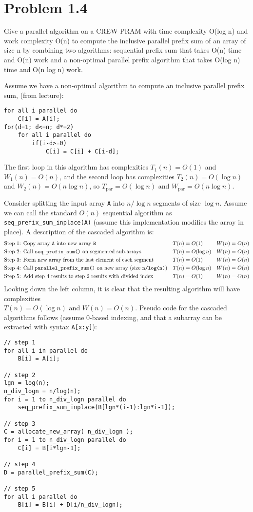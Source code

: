 \section*{Problem 1.4}
Give a parallel algorithm on a CREW PRAM with time complexity O(log n) and work
complexity O(n) to compute the inclusive parallel prefix sum of an array of size n by combining two
algorithms: sequential prefix sum that takes O(n) time and O(n) work and a non-optimal parallel prefix
algorithm that takes O(log n) time and O(n log n) work.
\probline

Assume we have a non-optimal algorithm to compute an inclusive parallel prefix sum, (from lecture):
\begin{lstlisting}
for all i parallel do
	C[i] = A[i];
for(d=1; d<=n; d*=2)
	for all i parallel do
		if(i-d>=0)
			C[i] = C[i] + C[i-d];
\end{lstlisting}

The first loop in this algorithm has complexities $T_1(n) = O(1)$ and $W_1(n) = O(n)$, and the second loop has complexities $T_2(n) = O(\log n)$ and $W_2(n) = O(n\log n)$, so $T_{\text{par}}=O(\log n)$ and $W_{\text{par}} = O(n \log n)$.

Consider splitting the input array \texttt{A} into $n/\log n$ segments of size $\log n$. Assume we can call the standard $O(n)$ sequential algorithm as \texttt{seq\_prefix\_sum\_inplace(A)} (assume this implementation modifies the array in place). A description of the cascaded algorithm is:
\begin{align*}
&\text{Step 1: Copy array \texttt{A} into new array \texttt{B}}& &T(n) = O(1) &W(n) = O(n)\\
&\text{Step 2: Call \texttt{seq\_prefix\_sum()} on segmented sub-arrays}& &T(n) = O(\log n) &W(n) = O(n)\\
&\text{Step 3: Form new array from the last element of each segment}& &T(n) = O(1) &W(n) = O(n)\\
&\text{Step 4: Call \texttt{parallel\_prefix\_sum()} on new array (size \texttt{n/log(n)})}& &T(n) = O(\log n) &W(n) = O(n)\\
&\text{Step 5: Add step 4 results to step 2 results with divided index}& &T(n) = O(1) &W(n) = O(n)
\end{align*}
Looking down the left column, it is clear that the resulting algorithm will have complexities\\
$\boxed{T(n) = O(\log n) \text{ and }W(n) = O(n)}$. Pseudo code for the cascaded algorithms follows (assume 0-based indexing, and that a subarray can be extracted with syntax \texttt{A[x:y]}):
\begin{lstlisting}
// step 1
for all i in parallel do
	B[i] = A[i];
	
// step 2
lgn = log(n);
n_div_logn = n/log(n);
for i = 1 to n_div_logn parallel do
	seq_prefix_sum_inplace(B[lgn*(i-1):lgn*i-1]);
	
// step 3
C = allocate_new_array( n_div_logn );
for i = 1 to n_div_logn parallel do
	C[i] = B[i*lgn-1];

// step 4
D = parallel_prefix_sum(C);

// step 5
for all i parallel do
	B[i] = B[i] + D[i/n_div_logn];

\end{lstlisting}